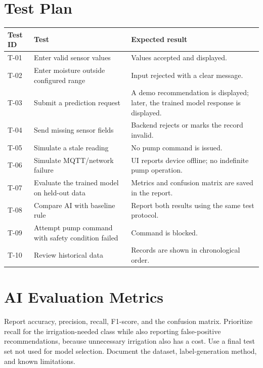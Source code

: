 \documentclass[12pt,a4paper]{report}
\begin{document}
\section{Test Plan}
\begin{longtable}{p{}p{}p{}}
\toprule
\textbf{Test ID} & \textbf{Test} & \textbf{Expected result}\\
\midrule
T-01 & Enter valid sensor values & Values accepted and displayed.\\
T-02 & Enter moisture outside configured range & Input rejected with a clear message.\\
T-03 & Submit a prediction request & A demo recommendation is displayed; later, the trained model response is displayed.\\
T-04 & Send missing sensor fields & Backend rejects or marks the record invalid.\\
T-05 & Simulate a stale reading & No pump command is issued.\\
T-06 & Simulate MQTT/network failure & UI reports device offline; no indefinite pump operation.\\
T-07 & Evaluate the trained model on held-out data & Metrics and confusion matrix are saved in the report.\\
T-08 & Compare AI with baseline rule & Report both results using the same test protocol.\\
T-09 & Attempt pump command with safety condition failed & Command is blocked.\\
T-10 & Review historical data & Records are shown in chronological order.\\
\bottomrule
\end{longtable}

\section{AI Evaluation Metrics}
Report accuracy, precision, recall, F1-score, and the confusion matrix. Prioritize recall for the irrigation-needed class while also reporting false-positive recommendations, because unnecessary irrigation also has a cost. Use a final test set not used for model selection. Document the dataset, label-generation method, and known limitations.
\end{document}
